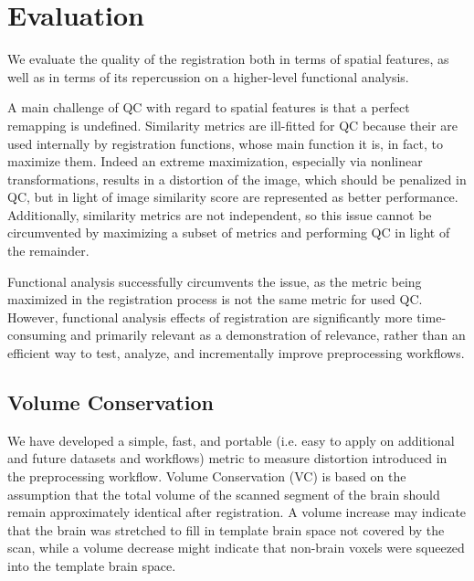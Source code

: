\section{Evaluation}

We evaluate the quality of the registration both in terms of spatial features, as well as in terms of its repercussion on a higher-level functional analysis.

A main challenge of QC with regard to spatial features is that a perfect remapping is undefined.
Similarity metrics are ill-fitted for QC because their are used internally by registration functions, whose main function it is, in fact, to maximize them.
Indeed an extreme maximization, especially via nonlinear transformations, results in a distortion of the image, which should be penalized in QC, but in light of image similarity score are represented as better performance.
Additionally, similarity metrics are not independent, so this issue cannot be circumvented by maximizing a subset of metrics and performing QC in light of the remainder.

Functional analysis successfully circumvents the issue, as the metric being maximized in the registration process is not the same metric for used QC.
However, functional analysis effects of registration are significantly more time-consuming and primarily relevant as a demonstration of relevance, rather than an efficient way to test, analyze, and incrementally improve preprocessing workflows.

\subsection{Volume Conservation}

We have developed a simple, fast, and portable (i.e. easy to apply on additional and future datasets and workflows) metric to measure distortion introduced in the preprocessing workflow.
Volume Conservation (VC) is based on the assumption that the total volume of the scanned segment of the brain should remain approximately identical after registration.
A volume increase may indicate that the brain was stretched to fill in template brain space not covered by the scan, while a volume decrease might indicate that non-brain voxels were squeezed into the template brain space.

